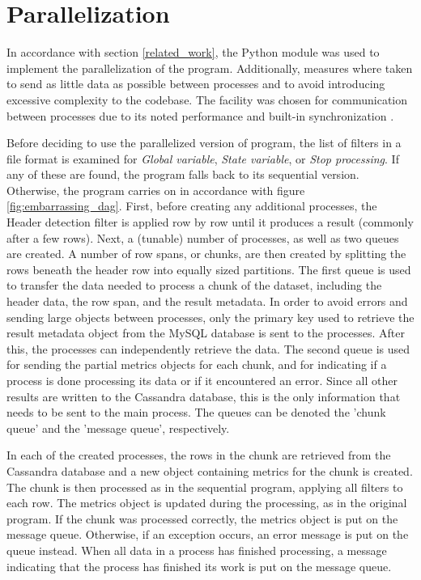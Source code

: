 \section{Parallelization}
In accordance with section \ref{related_work}, the Python  module was used to implement the parallelization of the program. Additionally, measures where taken to send as little
data as possible between processes and to avoid introducing excessive complexity to the codebase. The  facility was chosen for communication between processes due to its
noted performance and built-in synchronization \cite{singh_2013_parallel_padpwprfmm}.

Before deciding to use the parallelized version of program, the list of filters in a file format is examined for \textit{Global variable}, \textit{State variable}, or \textit{Stop processing}. If any of these are found, the
program falls back to its sequential version. Otherwise, the program carries on in accordance with figure \ref{fig:embarrassing_dag}. First, before creating any additional processes, the Header detection filter
is applied row by row until it produces a result (commonly after a few rows). Next, a (tunable) number of processes, as well as two queues are created. A number of row spans, or chunks, are then created by splitting
the rows beneath the header row into equally sized partitions. The first queue is used to transfer the data needed to process a chunk of the dataset, including the header data, the row span, and the result metadata.
In order to avoid errors and sending large objects between processes, only the primary key used to retrieve the result metadata object from the MySQL database is sent to the processes.
After this, the processes can independently retrieve the data. The second queue is used for sending the partial metrics objects for each chunk, and for indicating if a process is done processing
its data or if it encountered an error. Since all other results are written to the Cassandra database, this is the only information that needs to be sent to the main process. The queues can be
denoted the 'chunk queue' and the 'message queue', respectively.

In each of the created processes, the rows in the chunk are retrieved from the Cassandra database and a new object containing metrics for the chunk is created. The chunk is then processed as in the sequential program,
applying all filters to each row. The metrics object is updated during the processing, as in the original program. If the chunk was processed correctly, the metrics object is put on the message queue. Otherwise,
if an exception occurs, an error message is put on the queue instead. When all data in a process has finished processing, a message indicating that the process has finished its work is put on the message queue.

